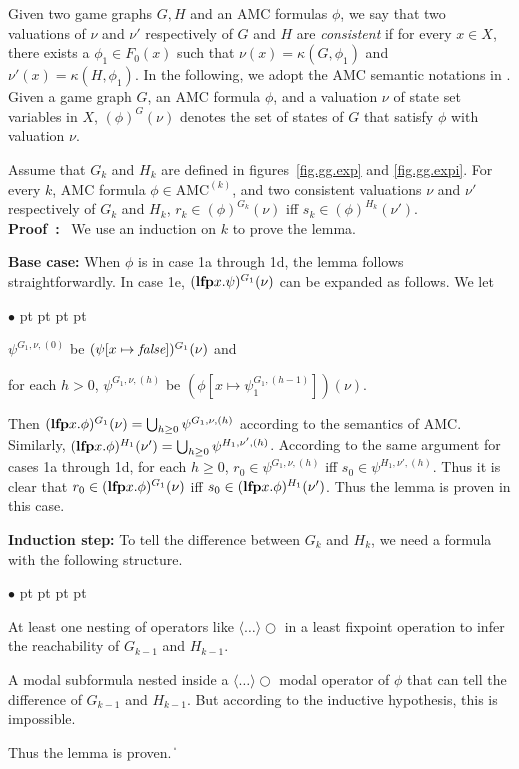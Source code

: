 \documentclass[11pt]{article}
\newcommand{\emlfp}{\mbox{\bf lfp}}
\newcommand{\false}{\mbox{\em false}}
\newcommand{\pf}{\noindent\mbox{\bf Proof : }}
\newcommand{\nxt}{\bigcirc}
\def\qed{\ifmmode\|\else{\unskip\nobreak\hfil
\penalty50\hskip1em\null\nobreak\hfil$\blacksquare$
\parfillskip=0pt\finalhyphendemerits=0\endgraf}\fi}
\newenvironment{list1}{\begin{list}{$\bullet$}
{\topsep 0 pt \parsep 0 pt \partopsep 0 pt \itemsep 0 pt}}{\end{list}}
\begin{document}
Given two game graphs $G,H$ and
an AMC formulas $\phi$,
we say that
two valuations of $\nu$ and $\nu'$ respectively of $G$ and $H$
are {\em consistent} if for every $x\in X$,
there exists a $\phi_1\in F_0(x)$ such that
$\nu(x)=\kappa(G,\phi_1)$ and $\nu'(x)=\kappa(H,\phi_1)$.
In the following, we adopt the AMC semantic notations in \cite{AHK02}.
Given a game graph $G$, an AMC formula $\phi$,
and a valuation $\nu$ of state set variables in $X$,
$(\phi)^G(\nu)$ denotes the set of states of $G$ that
satisfy $\phi$ with valuation $\nu$.







{\lemma\label{lemma.amc.induction}
Assume that $G_k$ and $H_k$ are defined in
figures~\ref{fig.gg.exp} and \ref{fig.gg.expi}.
For every $k$, AMC formula $\phi\in \mbox{AMC}^{(k)}$, and two consistent
valuations $\nu$ and $\nu'$ respectively of $G_k$ and $H_k$,
$r_k\in (\phi)^{G_k}(\nu)$ iff
$s_k\in (\phi)^{H_k}(\nu')$.
}
\\\pf
We use an induction on $k$ to prove the lemma.

\noindent
{\bf Base case:} 
When $\phi$ is in case 1a through 1d, the lemma follows straightforwardly.
In case 1e,
$(\emlfp x.\psi)^{G_1}(\nu)$ can be expanded as follows.
We let
\begin{list1}
\item $\psi^{G_1,\nu,(0)}$ be $(\psi[x\mapsto \false])^{G_1}(\nu)$ and
\item for each $h>0$,
    $\psi^{G_1,\nu,(h)}$ be $(\phi[x\mapsto \psi_1^{G_1,(h-1)}])(\nu)$.
\end{list1}
Then $(\emlfp x.\phi)^{G_1}(\nu)=\bigcup_{h\geq 0}\psi^{G_1,\nu,(h)}$
according to the semantics of AMC.
Similarly, \linebreak 
$(\emlfp x.\phi)^{H_1}(\nu')=\bigcup_{h\geq 0}\psi^{H_1,\nu',(h)}$.
According to the same argument for cases 1a through 1d,
for each $h\geq 0$,
$r_0\in \psi^{G_1,\nu,(h)}$ iff
$s_0\in \psi^{H_1,\nu',(h)}$.
Thus it is clear that
$r_0\in (\emlfp x.\phi)^{G_1}(\nu)$ iff
$s_0\in (\emlfp x.\phi)^{H_1}(\nu')$.
Thus the lemma is proven in this case.

\noindent
{\bf Induction step:}
To tell the difference between $G_k$ and $H_k$,
we need a formula with the following structure.
\begin{list1}
\item At least one nesting of operators
    like $\langle\ldots\rangle\nxt$ in a least fixpoint operation 
    to infer the reachability of $G_{k-1}$ and $H_{k-1}$.
\item A modal subformula nested inside a $\langle \ldots\rangle \nxt$
    modal operator of $\phi$ that can tell the difference
    of $G_{k-1}$ and $H_{k-1}$.  
    But according to the inductive hypothesis, this is impossible.  
\end{list1}
Thus the lemma is proven.
\qed
\end{document}
